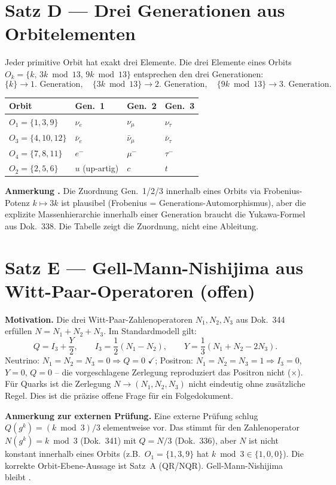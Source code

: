 \section{Satz D --- Drei Generationen aus Orbitelementen}

Jeder primitive Orbit hat exakt drei Elemente. Die drei Elemente
eines Orbits $O_k=\{k,\,3k\bmod13,\,9k\bmod13\}$ entsprechen den
drei Generationen:
\[
  \{k\} \to \text{1.\ Generation},\quad
  \{3k\bmod13\} \to \text{2.\ Generation},\quad
  \{9k\bmod13\} \to \text{3.\ Generation}.
\]

\begin{center}
\begin{tabular}{llll}
\toprule
Orbit & Gen.~1 & Gen.~2 & Gen.~3 \\
\midrule
$O_1=\{1,3,9\}$ & $\nu_e$ & $\nu_\mu$ & $\nu_\tau$ \\
$O_3=\{4,10,12\}$ & $\bar\nu_e$ & $\bar\nu_\mu$ & $\bar\nu_\tau$ \\
$O_4=\{7,8,11\}$ & $e^-$ & $\mu^-$ & $\tau^-$ \\
$O_2=\{2,5,6\}$ & $u$ (up-artig) & $c$ & $t$ \\
\bottomrule
\end{tabular}
\end{center}

\textbf{Anmerkung \SM.} Die Zuordnung Gen.~1/2/3 innerhalb eines Orbits
via Frobenius-Potenz $k\mapsto3k$ ist plausibel (Frobenius = Generations-Automorphismus),
aber die explizite Massenhierarchie innerhalb einer Generation braucht
die Yukawa-Formel aus Dok.~338. Die Tabelle zeigt die Zuordnung, nicht eine Ableitung.


\section{Satz E --- Gell-Mann-Nishijima aus Witt-Paar-Operatoren (offen) \SM}

\textbf{Motivation.} Die drei Witt-Paar-Zahlenoperatoren $N_1,N_2,N_3$ aus Dok.~344
erfüllen $N=N_1+N_2+N_3$. Im Standardmodell gilt:
\[
  Q = I_3 + \frac{Y}{2}, \qquad
  I_3 = \frac{1}{2}(N_1-N_2), \qquad
  Y = \frac{1}{3}(N_1+N_2-2N_3).
\]
Neutrino: $N_1=N_2=N_3=0\Rightarrow Q=0$ $\checkmark$;
Positron: $N_1=N_2=N_3=1\Rightarrow I_3=0$, $Y=0$, $Q=0$ -- die vorgeschlagene Zerlegung reproduziert das Positron nicht ($\times$).
Für Quarks ist die Zerlegung $N\to(N_1,N_2,N_3)$ nicht eindeutig ohne
zusätzliche Regel. Dies ist die präzise offene Frage für ein Folgedokument.

\textbf{Anmerkung zur externen Prüfung.}
Eine externe Prüfung schlug $Q(g^k)=(k\bmod3)/3$ elementweise vor.
Das stimmt für den Zahlenoperator $N(g^k)=k\bmod3$ (Dok.~341) mit $Q=N/3$ (Dok.~336),
aber $N$ ist nicht konstant innerhalb eines Orbits (z.B.\ $O_1=\{1,3,9\}$
hat $k\bmod3\in\{1,0,0\}$). Die korrekte Orbit-Ebene-Aussage ist Satz~A (QR/NQR).
Gell-Mann-Nishijima bleibt \SM.

